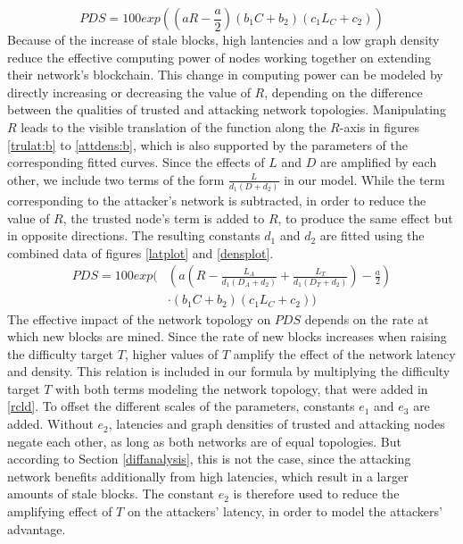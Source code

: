 \documentclass[a4paper,12pt,twoside]{report}
\begin{document}
\begin{equation}\label{rcl}
PDS = 100 exp \left( \left( a R- \frac{a}{2} \right) \left( b_1C+b_2 \right) \left( c_1L_C+c_2 \right) \right)
\end{equation}
Because of the increase of stale blocks, high lantencies and a low graph density reduce the effective computing power of nodes working together on extending their network's blockchain. This change in computing power can be modeled by directly increasing or decreasing the value of $R$, depending on the difference between the qualities of trusted and attacking network topologies. Manipulating $R$ leads to the visible translation of the function along the $R$-axis in figures \ref{trulat:b} to \ref{attdens:b}, which is also supported by the parameters of the corresponding fitted curves.  Since the effects of $L$ and $D$ are amplified by each other, we include two terms of the form $\frac{L}{d_1(D+d_2)}$ in our model. While the term corresponding to the attacker's network is subtracted, in order to reduce the value of $R$, the trusted node's term is added to $R$, to produce the same effect but in opposite directions. The resulting constants $d_1$ and $d_2$ are fitted using the combined data of figures \ref{latplot} and \ref{densplot}.
\begin{equation}\label{rcld}
\begin{split}
PDS = 100 exp \Biggl( & \left( a \left( R-\frac{ L_A}{d_1 \left( D_A+d_2 \right)}+\frac{ L_T}{d_1 \left( D_T+d_2 \right)} \right) - \frac{a}{2} \right) \\
           & \cdot \left( b_1C+b_2 \right) \left( c_1L_C+c_2 \right) \Biggr)
\end{split}
\end{equation}
The effective impact of the network topology on $PDS$ depends on the rate at which new blocks are mined. Since the rate of new blocks increases when raising the difficulty target $T$, higher values of $T$ amplify the effect of the network latency and density. This relation is included in our formula by multiplying the difficulty target $T$ with both terms modeling the network topology, that were added in \autoref{rcld}. To offset the different scales of the parameters, constants $e_1$ and $e_3$ are added. Without $e_2$, latencies and graph densities of trusted and attacking nodes negate each other, as long as both networks are of equal topologies. But according to Section \ref{diffanalysis}, this is not the case, since the attacking network benefits additionally from high latencies, which result in a larger amounts of stale blocks. The constant $e_2$ is therefore used to reduce the amplifying effect of $T$ on the attackers' latency, in order to model the attackers' advantage.
\end{document}

